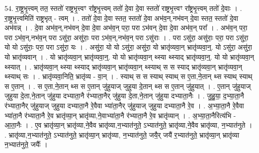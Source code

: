 \documentclass[17pt]{extarticle}
\begin{document}
54. रा॒ष्ट्र॒भृ॒त्त्वम् तत॒ स्ततो॑ राष्ट्रभृ॒त्त्वꣳ रा᳚ष्ट्रभृ॒त्त्वम् ततो॑ दे॒वा दे॒वा स्ततो॑ राष्ट्रभृ॒त्त्वꣳ रा᳚ष्ट्रभृ॒त्त्वम् ततो॑ दे॒वाः । . रा॒ष्ट्र॒भृ॒त्त्वमिति॑ राष्ट्रभृत् - त्वम् । . ततो॑ दे॒वा दे॒वा स्तत॒ स्ततो॑ दे॒वा अभ॑व॒न्,नभ॑वन् दे॒वा स्तत॒ स्ततो॑ दे॒वा अभ॑वन्न् । . दे॒वा अभ॑व॒न्,नभ॑वन् दे॒वा दे॒वा अभ॑व॒न् परा॒ परा ऽभ॑वन् दे॒वा दे॒वा अभ॑व॒न् परा᳚ । . अभ॑व॒न् परा॒ परा ऽभ॑व॒न्,नभ॑व॒न् परा ऽसु॑रा॒ असु॑राः॒ परा ऽभ॑व॒न्,नभ॑व॒न् परा ऽसु॑राः । . परा ऽसु॑रा॒ असु॑राः॒ परा॒ परा ऽसु॑रा॒ यो यो ऽसु॑राः॒ परा॒ परा ऽसु॑रा॒ यः । . असु॑रा॒ यो यो ऽसु॑रा॒ असु॑रा॒ यो भ्रातृ॑व्यवा॒न् भ्रातृ॑व्यवा॒न्॒. यो ऽसु॑रा॒ असु॑रा॒ यो भ्रातृ॑व्यवान् । . यो भ्रातृ॑व्यवा॒न् भ्रातृ॑व्यवा॒न्॒. यो यो भ्रातृ॑व्यवा॒न् थ्स्या थ्स्याद् भ्रातृ॑व्यवा॒न्॒. यो यो भ्रातृ॑व्यवा॒न् थ्स्यात् । . भ्रातृ॑व्यवा॒न् थ्स्या थ्स्याद् भ्रातृ॑व्यवा॒न् भ्रातृ॑व्यवा॒न् थ्स्याथ् स स स्याद् भ्रातृ॑व्यवा॒न् भ्रातृ॑व्यवा॒न् 
थ्स्याथ् सः । . भ्रातृ॑व्यवा॒निति॒ भ्रातृ॑व्य - वा॒न् । . स्याथ् स स स्याथ् स्याथ् स ए॒ता,ने॒तान् थ्स स्याथ् स्याथ् स ए॒तान् । . स ए॒ता,ने॒तान् थ्स स ए॒तान् जु॑हुयाज् जुहुया दे॒तान् थ्स स ए॒तान् जु॑हुयात् । . ए॒तान् जु॑हुयाज् जुहुया दे॒ता,ने॒तान् जु॑हुया दभ्याता॒नै र॑भ्याता॒नैर् जु॑हुया दे॒ता,ने॒तान् जु॑हुया दभ्याता॒नैः । . जु॒हु॒या॒ द॒भ्या॒ता॒नै र॑भ्याता॒नैर् जु॑हुयाज् जुहुया दभ्याता॒नै रे॒वैवा भ्या॑ता॒नैर् जु॑हुयाज् जुहुया दभ्याता॒नै रे॒व । . अ॒भ्या॒ता॒नै रे॒वैवा भ्या॑ता॒नै र॑भ्याता॒नै रे॒व भ्रातृ॑व्या॒न् भ्रातृ॑व्या,ने॒वाभ्या॑ता॒नै र॑भ्याता॒नै 
रे॒व भ्रातृ॑व्यान् । . अ॒भ्या॒ता॒नैरित्य॑भि - आ॒ता॒नैः । . ए॒व भ्रातृ॑व्या॒न् भ्रातृ॑व्या,ने॒वैव भ्रातृ॑व्या,न॒भ्यात॑नुते॒ ऽभ्यात॑नुते॒ भ्रातृ॑व्या,ने॒वैव भ्रातृ॑व्या, न॒भ्यात॑नुते । . भ्रातृ॑व्या,न॒भ्यात॑नुते॒ ऽभ्यात॑नुते॒ भ्रातृ॑व्या॒न् भ्रातृ॑व्या, न॒भ्यात॑नुते॒ जयै॒र् जयै॑ र॒भ्यात॑नुते॒ भ्रातृ॑व्या॒न् भ्रातृ॑व्या न॒भ्यात॑नुते॒ जयैः᳚ । \newline
\end{document}

